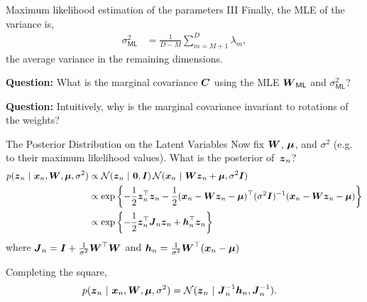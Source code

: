 \documentclass[aspectratio=169]{beamer}
\begin{document}
\begin{frame}[t]{Maximum likelihood estimation of the parameters III}
    Finally, the MLE of the variance is,
    \begin{align}
        \sigma^2_{\mathsf{ML}} &= \frac{1}{D - M} \sum_{m=M+1}^D \lambda_m, 
    \end{align}
    the average variance in the remaining dimensions. 
    
    \textbf{Question: } What is the marginal covariance $\boldsymbol{C}$ using the MLE $\boldsymbol{W}_{\mathsf{ML}}$ and $\sigma^2_{\mathsf{ML}}$?
    
    \textbf{Question: } Intuitively, why is the marginal covariance invariant to rotations of the weights?
\end{frame}

\begin{frame}[t]{The Posterior Distribution on the Latent Variables}
    Now fix $\boldsymbol{W}$, $\boldsymbol{\mu}$, and $\sigma^2$ (e.g. to their maximum likelihood values). What is the posterior of~$\boldsymbol{z}_n$?
    \begin{align}
        p(\boldsymbol{z}_n ~\vert~ \boldsymbol{x}_n, \boldsymbol{W}, \boldsymbol{\mu}, \sigma^2) 
        &\propto \mathcal{N}(\boldsymbol{z}_n ~\vert~ \boldsymbol{0}, \boldsymbol{I}) \, \mathcal{N}(\boldsymbol{x}_n ~\vert~ \boldsymbol{W} \boldsymbol{z}_n + \boldsymbol{\mu}, \sigma^2 \boldsymbol{I}) \\
        &\propto \exp \left\{ -\frac{1}{2} \boldsymbol{z}_n^\top \boldsymbol{z}_n -\frac{1}{2} (\boldsymbol{x}_n - \boldsymbol{W} \boldsymbol{z}_n - \boldsymbol{\mu})^\top (\sigma^2 \boldsymbol{I})^{-1} (\boldsymbol{x}_n - \boldsymbol{W} \boldsymbol{z}_n - \boldsymbol{\mu}) \right\} \\
        &\propto \exp \left\{ -\frac{1}{2} \boldsymbol{z}_n^\top \boldsymbol{J}_n \boldsymbol{z}_n + \boldsymbol{h}_n^\top\boldsymbol{z}_n \right\} \\
    \end{align}
    where $\boldsymbol{J}_n = \boldsymbol{I} + \frac{1}{\sigma^2} \boldsymbol{W}^\top \boldsymbol{W}$ and $ \boldsymbol{h}_n = \frac{1}{\sigma^2} \boldsymbol{W}^\top (\boldsymbol{x}_n - \boldsymbol{\mu})$
    
    Completing the square,
    \begin{align}
        p(\boldsymbol{z}_n ~\vert~ \boldsymbol{x}_n, \boldsymbol{W}, \boldsymbol{\mu}, \sigma^2) &= \mathcal{N}(\boldsymbol{z}_n ~\vert~ \boldsymbol{J}_n^{-1} \boldsymbol{h}_n, \boldsymbol{J}_n^{-1}).
    \end{align}
    
    
\end{frame}

\end{document}
